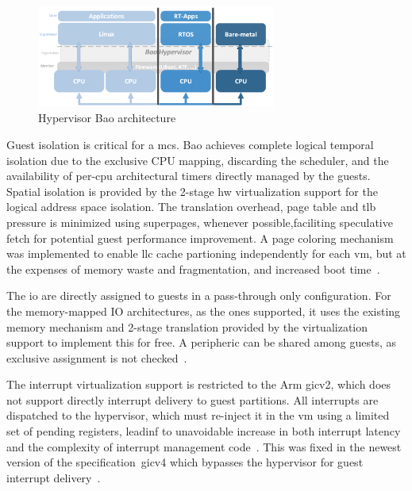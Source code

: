 \begin{figure}[!hbt]
  \centering
  \includegraphics[width=0.7\textwidth]{./img/png/bao-arch} 
%   
  \caption[Hypervisor Bao architecture]{Hypervisor Bao architecture~\cite{martins_et_al:OASIcs:2020:11779}\footnotemark}%
  \label{fig:bao-arch}
\end{figure}
%
%

Guest isolation is critical for a \gls{mcs}. Bao achieves complete logical
temporal isolation due to the exclusive CPU mapping, discarding the scheduler,
and the availability of per-\gls{cpu} architectural timers directly managed by
the guests. Spatial isolation is provided by the 2-stage \gls{hw} virtualization
support for the logical address space isolation. The translation overhead, page
table and \gls{tlb} pressure is minimized using superpages, whenever
possible,faciliting speculative fetch for potential guest performance
improvement. A page coloring mechanism was implemented to enable \gls{llc}
cache partioning independently for each \gls{vm}, but at the expenses of memory
waste and fragmentation, and increased boot time~\cite{martins_et_al:OASIcs:2020:11779}.

The \gls{io} are directly assigned to guests in a pass-through only
configuration. For the memory-mapped IO architectures, as the ones supported, it
uses the existing memory mechanism and 2-stage translation provided by the
virtualization support to implement this for free. A peripheric can be shared
among guests, as exclusive assignment is not checked~\cite{martins_et_al:OASIcs:2020:11779}.

The interrupt virtualization support is restricted to the Arm \gls{gic}v2, which
does not support directly interrupt delivery to guest partitions. All interrupts
are dispatched to the hypervisor, which must re-inject it in the \gls{vm} using
a limited set of pending registers, leadinf to unavoidable increase in both
interrupt latency and the complexity of interrupt management code~\cite{martins_et_al:OASIcs:2020:11779}. This was
fixed in the newest version of the specification~\gls{gic}v4 which bypasses the hypervisor for guest interrupt delivery~\cite{dall2018design}.

